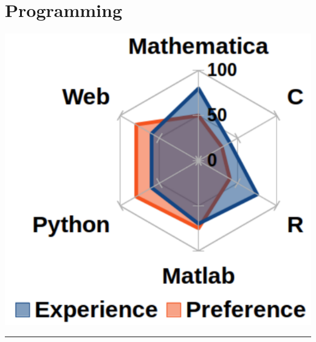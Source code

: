 \documentclass{article}
\begin{document}
\begin{minipage}[t]{0.27\textwidth}
    \section*{\fontsize{18pt}{24pt}\selectfont \color{pblue} Programming}
	\vspace{-2mm}
	\includegraphics[trim=0.5cm 0.2cm 0.3cm 0.2cm,clip,scale=0.32]{../img/programming.pdf}
	\vspace{2mm}
	\hrule
	\vspace{-2mm}

\end{minipage}
\end{document}
